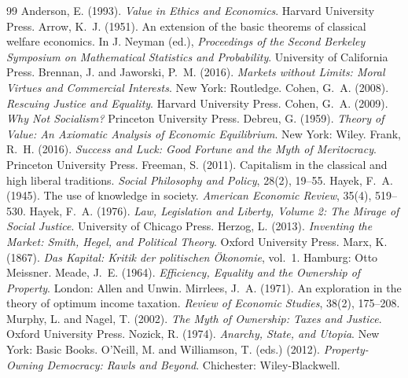 \documentclass{situationist-preprint}
\begin{document}
\begin{thebibliography}{99}\small
{} Anderson, E. (1993). \emph{Value in Ethics and Economics}. Harvard University Press.
 Arrow, K.~J. (1951). An extension of the basic theorems of classical welfare economics. In J. Neyman (ed.), \emph{Proceedings of the Second Berkeley Symposium on Mathematical Statistics and Probability}. University of California Press.
 Brennan, J. and Jaworski, P.~M. (2016). \emph{Markets without Limits: Moral Virtues and Commercial Interests}. New York: Routledge.
 Cohen, G.~A. (2008). \emph{Rescuing Justice and Equality}. Harvard University Press.
 Cohen, G.~A. (2009). \emph{Why Not Socialism?} Princeton University Press.
 Debreu, G. (1959). \emph{Theory of Value: An Axiomatic Analysis of Economic Equilibrium}. New York: Wiley.
 Frank, R.~H. (2016). \emph{Success and Luck: Good Fortune and the Myth of Meritocracy}. Princeton University Press.
 Freeman, S. (2011). Capitalism in the classical and high liberal traditions. \emph{Social Philosophy and Policy}, 28(2), 19--55.
 Hayek, F.~A. (1945). The use of knowledge in society. \emph{American Economic Review}, 35(4), 519--530.
 Hayek, F.~A. (1976). \emph{Law, Legislation and Liberty, Volume 2: The Mirage of Social Justice}. University of Chicago Press.
 Herzog, L. (2013). \emph{Inventing the Market: Smith, Hegel, and Political Theory}. Oxford University Press.
 Marx, K. (1867). \emph{Das Kapital: Kritik der politischen \"Okonomie}, vol.~1. Hamburg: Otto Meissner.
 Meade, J.~E. (1964). \emph{Efficiency, Equality and the Ownership of Property}. London: Allen and Unwin.
 Mirrlees, J.~A. (1971). An exploration in the theory of optimum income taxation. \emph{Review of Economic Studies}, 38(2), 175--208.
 Murphy, L. and Nagel, T. (2002). \emph{The Myth of Ownership: Taxes and Justice}. Oxford University Press.
 Nozick, R. (1974). \emph{Anarchy, State, and Utopia}. New York: Basic Books.
 O'Neill, M. and Williamson, T. (eds.) (2012). \emph{Property-Owning Democracy: Rawls and Beyond}. Chichester: Wiley-Blackwell.

\end{thebibliography}
\end{document}
